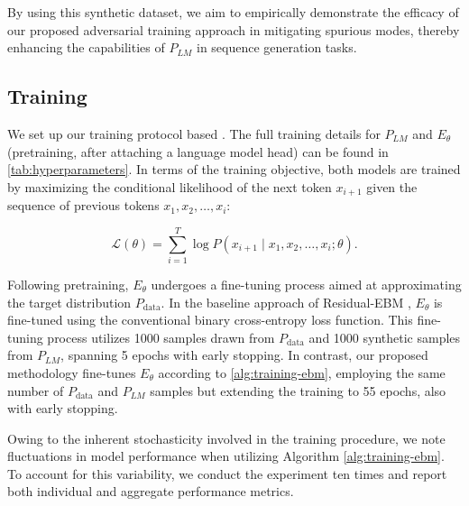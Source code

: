 \documentclass[11pt]{article}
\begin{document}
By using this synthetic dataset, we aim to empirically demonstrate the efficacy of our proposed adversarial training approach in mitigating spurious modes, thereby enhancing the capabilities of \(P_{LM}\) in sequence generation tasks.
\subsection{Training}

We set up our training protocol based  \cite{ResidualEBM2023}.
The full training details for \(P_{LM}\) and \(E_\theta\) (pretraining, after attaching a language model head) can be found in \cref{tab:hyperparameters}.
In terms of the training objective, both models are trained by maximizing the conditional likelihood of the next token \( x_{i+1} \) given the sequence of previous tokens \( x_1, x_2, \ldots, x_i \):

\begin{equation}
  \label{eq:seq_mle}
\mathcal{L}(\theta) = \sum_{i=1}^{T} \log P(x_{i+1} \mid x_1, x_2, \ldots, x_i; \theta).
\end{equation}


Following pretraining, \(E_\theta\) undergoes a fine-tuning process aimed at approximating the target distribution \(P_\text{data}\). In the baseline approach of Residual-EBM \cite{deng2019residual},  \(E_\theta\) is fine-tuned using the conventional binary cross-entropy loss function. This fine-tuning process utilizes 1000 samples drawn from \(P_\text{data}\) and 1000 synthetic samples from \(P_{LM}\), spanning 5 epochs with early stopping. In contrast, our proposed methodology fine-tunes \(E_\theta\) according to \cref{alg:training-ebm}, employing the same number of \(P_\text{data}\) and \(P_{LM}\) samples but extending the training to 55 epochs, also with early stopping.  

Owing to the inherent stochasticity involved in the training procedure, we note fluctuations in model performance when utilizing Algorithm \ref{alg:training-ebm}. To account for this variability, we conduct the experiment ten times and report both individual and aggregate performance metrics.
\end{document}
